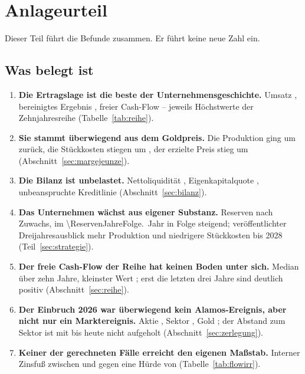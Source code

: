 \section{Anlageurteil}
\label{sec:urteil}

Dieser Teil f\"uhrt die Befunde zusammen. Er f\"uhrt keine neue Zahl ein.

\subsection{Was belegt ist}

\begin{enumerate}
\item \textbf{Die Ertragslage ist die beste der Unternehmensgeschichte.}
Umsatz \MioUSDexakt{\Umsatz}, bereinigtes Ergebnis
\MioUSDexakt{\BereinigtesErgebnis}, freier Cash-Flow
\MioUSDexakt{\FCFReiheXXV} -- jeweils H\"ochstwerte der Zehnjahresreihe
(Tabelle~\ref{tab:reihe}).

\item \textbf{Sie stammt \"uberwiegend aus dem Goldpreis.} Die Produktion ging
um \PctBetrag{\ProduktionDelta} zur\"uck, die St\"uckkosten stiegen um
\Pct{\AISCDelta}, der erzielte Preis stieg um \Pct{\GoldpreisDelta}
(Abschnitt~\ref{sec:margejeunze}).

\item \textbf{Die Bilanz ist unbelastet.} Nettoliquidit\"at
\MioUSDexakt{\Nettoliquiditaet}, Eigenkapitalquote
\Pct{\Eigenkapitalquote}, unbeanspruchte Kreditlinie
\MioUSDexakt{\FazilitaetUnbeansprucht} (Abschnitt~\ref{sec:bilanz}).

\item \textbf{Das Unternehmen w\"achst aus eigener Substanz.} Reserven
\MozReserven{\Reserven} nach \Pct{\ReservenDelta} Zuwachs, im
\num{\ReservenJahreFolge}.\ Jahr in Folge steigend; ver\"offentlichter
Dreijahresausblick \Pct{\ProgAchtProdDelta} mehr Produktion und
\Pct{\ProgAchtAISCRueckgang} niedrigere St\"uckkosten bis 2028
(Teil~\ref{sec:strategie}).

\item \textbf{Der freie Cash-Flow der Reihe hat keinen Boden unter sich.}
Median \MioUSDexakt{\FCFMedian} \"uber zehn Jahre, kleinster Wert
\MioUSDexakt{\FCFMin}; erst die letzten drei Jahre sind deutlich positiv
(Abschnitt~\ref{sec:reihe}).

\item \textbf{Der Einbruch 2026 war \"uberwiegend kein Alamos-Ereignis, aber
nicht nur ein Marktereignis.} Aktie \Pct{\EinbruchAktie}, Sektor
\Pct{\EinbruchSektor}, Gold \Pct{\EinbruchGold}; der Abstand zum Sektor ist
mit \Pct{\AbstandUeberschuss} bis heute nicht aufgeholt
(Abschnitt~\ref{sec:zerlegung}).

\item \textbf{Keiner der gerechneten F\"alle erreicht den eigenen
Ma{\ss}stab.} Interner Zinsfu{\ss} zwischen
\Pct{\FlowIRRAFuenf} und \Pct{\FlowIRRCFuenfzehn} gegen eine H\"urde von
\Pct{\FlowHuerde} (Tabelle~\ref{tab:flowirr}).
\end{enumerate}

